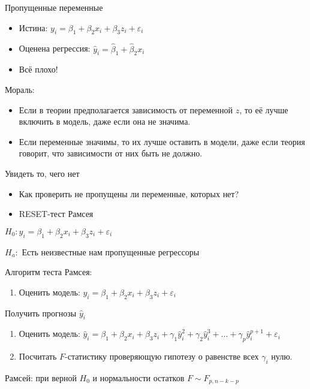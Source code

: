 \documentclass[ignorenonframetext,]{beamer}
\begin{document}
\begin{frame}{Пропущенные переменные}

\begin{itemize}
\item
  Истина: $y_i = \beta_1 + \beta_2 x_i + \beta_3 z_i +\varepsilon_i$
\item
  Оценена регрессия: $\hat{y}_i=\hat{\beta}_1 + \hat{\beta}_2 x_i$
\item
  Всё плохо!
\end{itemize}

\end{frame}

\begin{frame}{Мораль:}

\begin{itemize}
\item
  Если в теории предполагается зависимость от переменной $z$, то её
  лучше включить в модель, даже если она не значима.
\item
  Если переменные значимы, то их лучше оставить в модели, даже если
  теория говорит, что зависимости от них быть не должно.
\end{itemize}

\end{frame}

\begin{frame}{Увидеть то, чего нет}

\begin{itemize}
\item
  Как проверить не пропущены ли переменные, которых нет?
\item
  RESET-тест Рамсея
\end{itemize}

$H_0: y_i = \beta_1 + \beta_2 x_i + \beta_3 z_i + \varepsilon_i$

$H_a:$ Есть неизвестные нам пропущенные регрессоры

\end{frame}

\begin{frame}{Алгоритм теста Рамсея:}

\begin{enumerate}
\def\labelenumi{\arabic{enumi}.}
\itemsep1pt\parskip0pt
\item
  Оценить модель:
  $y_i = \beta_1 + \beta_2 x_i + \beta_3 z_i + \varepsilon_i$
\end{enumerate}

Получить прогнозы $\hat{y}_i$

\begin{enumerate}
\def\labelenumi{\arabic{enumi}.}
\setcounter{enumi}{1}
\item
  Оценить модель:
  $\hat{y}_i = \beta_1 + \beta_2 x_i + \beta_3 z_i + \gamma_1 \hat{y}^2_i + \gamma_2 \hat{y}^3_i + \ldots + \gamma_p \hat{y}_i^{p+1} + \varepsilon_i$
\item
  Посчитать $F$-статистику проверяющую гипотезу о равенстве всех
  $\gamma_i$ нулю.
\end{enumerate}

Рамсей: при верной $H_0$ и нормальности остатков $F\sim F_{p,n-k-p}$

\end{frame}
\end{document}
